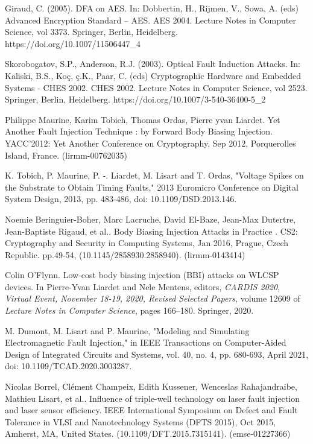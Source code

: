 
\begin{thebibliography}{1}

Giraud, C. (2005). DFA on AES. In: Dobbertin, H., Rijmen, V., Sowa, A. (eds) Advanced Encryption Standard – AES. AES 2004. Lecture Notes in Computer Science, vol 3373. Springer, Berlin, Heidelberg. https://doi.org/10.1007/11506447\_4

Skorobogatov, S.P., Anderson, R.J. (2003). Optical Fault Induction Attacks. In: Kaliski, B.S., Koç, ç.K., Paar, C. (eds) Cryptographic Hardware and Embedded Systems - CHES 2002. CHES 2002. Lecture Notes in Computer Science, vol 2523. Springer, Berlin, Heidelberg. https://doi.org/10.1007/3-540-36400-5\_2

Philippe Maurine, Karim Tobich, Thomas Ordas, Pierre yvan Liardet. Yet Another Fault Injection Technique : by Forward Body Biasing Injection. YACC'2012: Yet Another Conference on Cryptography, Sep 2012, Porquerolles Island, France. (lirmm-00762035)

K. Tobich, P. Maurine, P. -. Liardet, M. Lisart and T. Ordas, "Voltage Spikes on the Substrate to Obtain Timing Faults," 2013 Euromicro Conference on Digital System Design, 2013, pp. 483-486, doi: 10.1109/DSD.2013.146.

Noemie Beringuier-Boher, Marc Lacruche, David El-Baze, Jean-Max Dutertre, Jean-Baptiste Rigaud, et al.. Body Biasing Injection Attacks in Practice . CS2: Cryptography and Security in Computing Systems, Jan 2016, Prague, Czech Republic. pp.49-54, (10.1145/2858930.2858940). (lirmm-0143414)

Colin O'Flynn.
\newblock Low-cost body biasing injection {(BBI)} attacks on {WLCSP} devices.
\newblock In Pierre{-}Yvan Liardet and Nele Mentens, editors, {\em{CARDIS}
2020, Virtual Event, November 18-19, 2020, Revised Selected Papers}, volume
12609 of {\em Lecture Notes in Computer Science}, pages 166--180. Springer,
2020.

M. Dumont, M. Lisart and P. Maurine, "Modeling and Simulating Electromagnetic Fault Injection," in IEEE Transactions on Computer-Aided Design of Integrated Circuits and Systems, vol. 40, no. 4, pp. 680-693, April 2021, doi: 10.1109/TCAD.2020.3003287.

Nicolas Borrel, Clément Champeix, Edith Kussener, Wenceslas Rahajandraibe, Mathieu Lisart, et al.. Influence of triple-well technology on laser fault injection and laser sensor efficiency. IEEE International Symposium on Defect and Fault Tolerance in VLSI and Nanotechnology Systems (DFTS 2015), Oct 2015, Amherst, MA, United States. (10.1109/DFT.2015.7315141). (emse-01227366)


\end{thebibliography}
